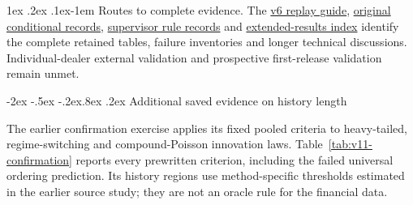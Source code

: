 \documentclass[10pt,a4paper]{article}
\makeatletter
\renewcommand\section{\@startsection{section}{1}{\z@}%
  {-2ex \@plus -.5ex \@minus -.2ex}{.8ex \@plus .2ex}%
  {\normalfont\large\bfseries}}
\renewcommand\paragraph{\@startsection{paragraph}{4}{\z@}%
  {1ex \@plus .2ex \@minus .1ex}{-1em}%
  {\normalfont\normalsize\bfseries}}
\makeatother
\begin{document}
\paragraph{Routes to complete evidence.}
The \href{https://github.com/ByronLi0207/financial-mathematics-paper-20261020/blob/revision-v7-final/protocol/revision-v6/REPLAY.md}{v6 replay guide},
\href{https://github.com/ByronLi0207/financial-mathematics-paper-20261020/blob/revision-v7-final/results/revision-20261022/README.md}{original conditional records},
\href{https://github.com/ByronLi0207/financial-mathematics-paper-20261020/blob/revision-v7-final/results/supervisor-20261023/r6/README.md}{supervisor rule records} and
\href{https://github.com/ByronLi0207/financial-mathematics-paper-20261020/blob/revision-v7-final/EXTENDED_RESULTS.md}{extended-results index} identify the
complete retained tables, failure inventories and longer technical discussions.
Individual-dealer external validation and prospective first-release validation remain unmet.

\FloatBarrier

\section{Additional saved evidence on history length}\label{sup:v11-history}

The earlier confirmation exercise applies its fixed pooled criteria to heavy-tailed, regime-switching and compound-Poisson innovation laws. Table~\ref{tab:v11-confirmation} reports every prewritten criterion, including the failed universal ordering prediction. Its history regions use method-specific thresholds estimated in the earlier source study; they are not an oracle rule for the financial data.
\end{document}
